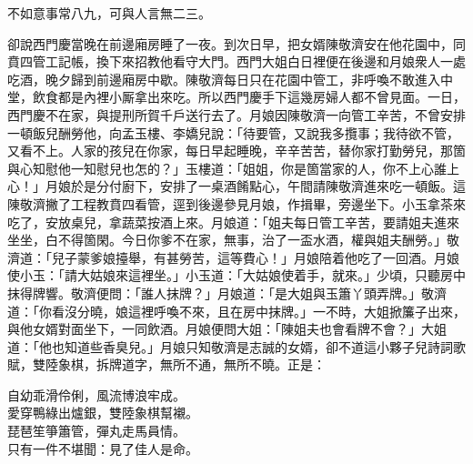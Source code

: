 \begin{myquote}
不如意事常八九，可與人言無二三。
\end{myquote}

卻說西門慶當晚在前邊廂房睡了一夜。到次日早，把女婿陳敬濟安在他花園中，同賁四管工記帳，換下來招教他看守大門。西門大姐白日裡便在後邊和月娘衆人一處吃酒，晚夕歸到前邊廂房中歇。陳敬濟每日只在花園中管工，非呼喚不敢進入中堂，飲食都是內裡小厮拿出來吃。所以西門慶手下這幾房婦人都不曾見面。一日，西門慶不在家，與提刑所賀千戶送行去了。月娘因陳敬濟一向管工辛苦，不曾安排一頓飯兒酬勞他，向孟玉樓、李嬌兒說：「待要管，又說我多攬事；我待欲不管，又看不上。{}人家的孩兒在你家，每日早起睡晚，辛辛苦苦，替你家打勤勞兒，那箇與心知慰他一知慰兒也怎的？」玉樓道：「姐姐，你是箇當家的人，你不上心誰上心！」月娘於是分付廚下，安排了一桌酒餚點心，午間請陳敬濟進來吃一頓飯。這陳敬濟撇了工程教賁四看管，逕到後邊參見月娘，作揖畢，旁邊坐下。小玉拿茶來吃了，安放桌兒，拿蔬菜按酒上來。月娘道：「姐夫每日管工辛苦，要請姐夫進來坐坐，白不得箇閑。今日你爹不在家，無事，治了一盃水酒，權與姐夫酬勞。」敬濟道：「兒子蒙爹娘擡舉，有甚勞苦，這等費心！」月娘陪着他吃了一回酒。月娘使小玉：「請大姑娘來這裡坐。」小玉道：「大姑娘使着手，就來。」少頃，只聽房中抹得牌響。敬濟便問：「誰人抹牌？」月娘道：「是大姐與玉簫丫頭弄牌。」敬濟道：「你看沒分曉，娘這裡呼喚不來，且在房中抹牌。」一不時，大姐掀簾子出來，與他女婿對面坐下，一同飲酒。月娘便問大姐：「陳姐夫也會看牌不會？」大姐道：「他也知道些香臭兒。」{}月娘只知敬濟是志誠的女婿，卻不道這小夥子兒詩詞歌賦，{}雙陸象棋，拆牌道字，無所不通，無所不曉。正是：

\begin{myquote}
自幼乖滑伶俐，風流博浪牢成。\\愛穿鴨綠出爐銀，雙陸象棋幫襯。\\琵琶笙箏簫管，彈丸走馬員情。\\只有一件不堪聞：見了佳人是命。
\end{myquote}

